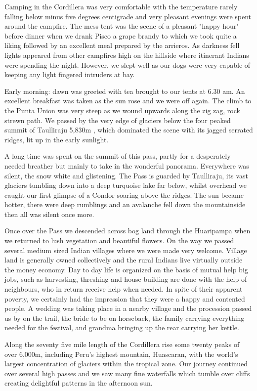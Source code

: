 \documentclass[a5paper,openany,font 10pt]{scrbook}
\begin{document}
Camping in the Cordillera was very comfortable with the
temperature rarely falling below minus five degrees centigrade
and very pleasant evenings were spent around the campfire. The
mess tent was the scene of a pleasant "happy hour" before dinner
when we drank Pisco   a grape brandy to which we took quite a
liking   followed by an excellent meal prepared by the arrieros.
As darkness fell lights appeared from other campfires high on the
hillside where itinerant Indians were spending the night.
However, we slept well as our dogs were very capable of keeping
any light fingered intruders at bay.

Early morning: dawn was greeted with tea brought to our
tents at 6.30 am. An excellent breakfast was taken as the sun
rose and we were off again. The climb to the Punta Union was very
steep as we wound upwards along the zig zag, rock strewn path. We
passed by the very edge of glaciers below the four peaked summit
of Taulliraju  5,830m , which dominated the scene with its jagged
serrated ridges, lit up in the early sunlight.

A long time was spent on the summit of this pass, partly for
a desperately needed breather but mainly to take in the wonderful
panorama. Everywhere was silent, the snow white and glistening.
The Pass is guarded by Taulliraju, its vast glaciers tumbling
down into a deep turquoise lake far below, whilst overhead we
caught our first glimpse of a Condor soaring above the ridges.
The sun became hotter, there were deep rumblings and an avalanche
fell down the mountainside   then all was silent once more.

Once over the Pass we descended across bog land through the
Huaripampa when we returned to lush vegetation and beautiful
flowers. On the way we passed several medium sized Indian
villages where we were made very welcome. Village land is
generally owned collectively and the rural Indians live virtually
outside the money economy. Day to day life is organized on the
basis of mutual help  big jobs, such as harvesting, threshing and
house building are done with the help of neighbours, who in
return receive help when needed. In spite of their apparent
poverty, we certainly had the impression that they were a happy
and contented people. A wedding was taking place in a nearby
village and the procession passed us by on the trail, the bride
to be on horseback, the family carrying everything needed for the
festival, and grandma bringing up the rear carrying her kettle.

Along the seventy five mile length of the Cordillera rise
some twenty peaks of over 6,000m, including Peru's highest
mountain, Huascaran, with the world's largest concentration of
glaciers within the tropical zone. Our journey continued over
several high passes and we saw many fine waterfalls which tumble
over cliffs creating delightful patterns in the afternoon sun.
\end{document}
